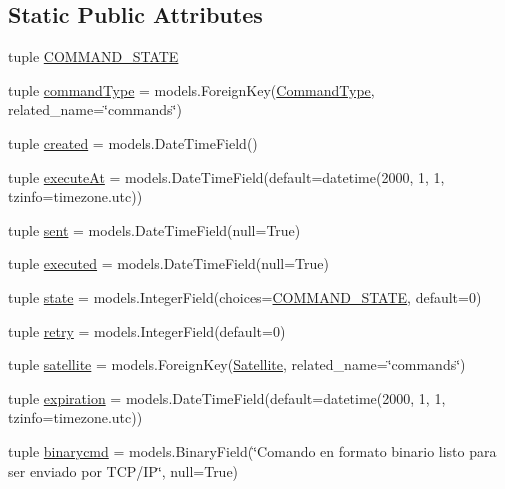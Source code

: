 \subsection*{Static Public Attributes}
\begin{DoxyCompactItemize}
\item 
tuple \hyperlink{class_ground_segment_1_1models_1_1_command_1_1_command_1_1_command_a59849751ec75c3c110fe1dabedd60654}{C\+O\+M\+M\+A\+N\+D\+\_\+\+S\+T\+A\+T\+E}
\item 
tuple \hyperlink{class_ground_segment_1_1models_1_1_command_1_1_command_1_1_command_a8b7882e00f489b55791e10afdb35ce0c}{command\+Type} = models.\+Foreign\+Key(\hyperlink{class_ground_segment_1_1models_1_1_command_1_1_command_type_1_1_command_type}{Command\+Type}, related\+\_\+name=\char`\"{}commands\char`\"{})
\item 
tuple \hyperlink{class_ground_segment_1_1models_1_1_command_1_1_command_1_1_command_a64faf0569fc31e7478b2979e0eac3281}{created} = models.\+Date\+Time\+Field()
\item 
tuple \hyperlink{class_ground_segment_1_1models_1_1_command_1_1_command_1_1_command_a10e67f4dfa4a252ab087e5a0a1505dfb}{execute\+At} = models.\+Date\+Time\+Field(default=datetime(2000, 1, 1, tzinfo=timezone.\+utc))
\item 
tuple \hyperlink{class_ground_segment_1_1models_1_1_command_1_1_command_1_1_command_a7bb120290e66f9a1d4f9d1427c896d93}{sent} = models.\+Date\+Time\+Field(null=True)
\item 
tuple \hyperlink{class_ground_segment_1_1models_1_1_command_1_1_command_1_1_command_a3d9c3610dd59bacdabd59da33679db82}{executed} = models.\+Date\+Time\+Field(null=True)
\item 
tuple \hyperlink{class_ground_segment_1_1models_1_1_command_1_1_command_1_1_command_af56e8c0eb67228f4f1b20a3495b7751d}{state} = models.\+Integer\+Field(choices=\hyperlink{class_ground_segment_1_1models_1_1_command_1_1_command_1_1_command_a59849751ec75c3c110fe1dabedd60654}{C\+O\+M\+M\+A\+N\+D\+\_\+\+S\+T\+A\+T\+E}, default=0)
\item 
tuple \hyperlink{class_ground_segment_1_1models_1_1_command_1_1_command_1_1_command_acc47affcbcab8cc9f63467b9db085d9b}{retry} = models.\+Integer\+Field(default=0)
\item 
tuple \hyperlink{class_ground_segment_1_1models_1_1_command_1_1_command_1_1_command_aa4b99f369d0e6f9d701875f9bd16d238}{satellite} = models.\+Foreign\+Key(\hyperlink{class_ground_segment_1_1models_1_1_satellite_1_1_satellite}{Satellite}, related\+\_\+name=\char`\"{}commands\char`\"{})
\item 
tuple \hyperlink{class_ground_segment_1_1models_1_1_command_1_1_command_1_1_command_a3595e7065386bcd506de63f7a96e7111}{expiration} = models.\+Date\+Time\+Field(default=datetime(2000, 1, 1, tzinfo=timezone.\+utc))
\item 
tuple \hyperlink{class_ground_segment_1_1models_1_1_command_1_1_command_1_1_command_a267a0f03e44500bb9d7e1eec529964f1}{binarycmd} = models.\+Binary\+Field(\char`\"{}Comando en formato binario listo para ser enviado por T\+C\+P/I\+P\char`\"{}, null=True)
\end{DoxyCompactItemize}


